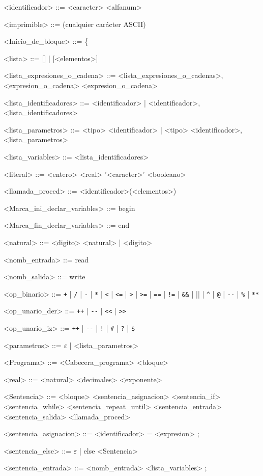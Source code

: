 \begin{grammar}
<identificador> ::= <caracter> <alfanum>

<imprimible> ::= (cualquier carácter ASCII)

<Inicio_de_bloque> ::= \{

<lista> ::= [] | [<elementos>]

<lista_expresiones_o_cadena> ::= <lista_expresiones_o_cadenas>, <expresion_o_cadena>
\alt <expresion_o_cadena>

<lista_identificadores> ::= <identificador> | <identificador>, <lista_identificadores>

<lista_parametros> ::= <tipo> <identificador> | <tipo> <identificador>, <lista_parametros>

<lista_variables> ::= <lista_identificadores>

<literal> ::= <entero>
\alt <real>
\alt '<caracter>'
\alt <booleano>

<llamada_proced> ::= <identificador>(<elementos>)

<Marca_ini_declar_variables> ::= begin

<Marca_fin_declar_variables> ::= end

<natural> ::= <digito> <natural> | <digito>

<nomb_entrada> ::= read

<nomb_salida> ::= write

<op_binario> ::= \verb|+| | \verb|/| | \verb|-| | \verb|*| | \verb|<| | \verb|<=| | \verb|>| | \verb|>=| | \verb|==| | \verb|!=| | \verb|&&| | \verb|||| | \verb|^| | \verb|@| | \verb|--| | \verb|%| | \verb|**|

<op_unario_der> ::= \verb|++| | \verb|--| | \verb|<<| | \verb|>>|

<op_unario_iz> ::= \verb|++| | \verb|--| | \verb|!| | \verb|#| | \verb|?| | \verb|$|

<parametros> ::= $\varepsilon$ | <lista_parametros>

<Programa> ::= <Cabecera_programa> <bloque>

<real> ::= <natural> <decimales> <exponente>

<Sentencia> ::= <bloque>
\alt <sentencia_asignacion>
\alt <sentencia_if>
\alt <sentencia_while>
\alt <sentencia_repeat_until>
\alt <sentencia_entrada>
\alt <sentencia_salida>
\alt <llamada_proced>

<sentencia_asignacion> ::=  <identificador> = <expresion> ;

<sentencia_else> ::= $\varepsilon$ | else <Sentencia>

<sentencia_entrada> ::= <nomb_entrada> <lista_variables> ;


\end{grammar}
